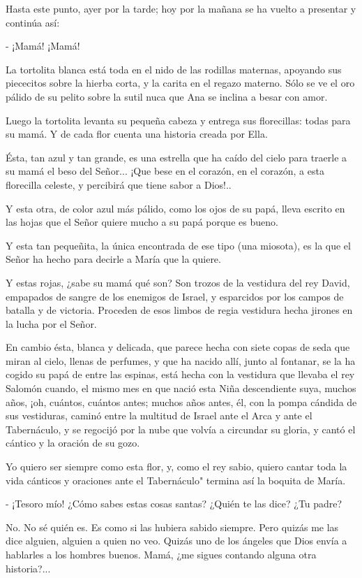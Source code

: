 \documentclass[12pt]{book} %
\begin{document}
Hasta este punto, ayer por la tarde; hoy por la mañana se ha vuelto a presentar y continúa así: 

- ¡Mamá! ¡Mamá! 

La tortolita blanca está toda en el nido de las rodillas maternas, apoyando sus piececitos sobre la hierba corta, y la carita en el regazo materno. Sólo se ve el oro pálido de su pelito sobre la sutil nuca que Ana se inclina a besar con amor. 

Luego la tortolita levanta su pequeña cabeza y entrega sus florecillas: todas para su mamá. Y de cada flor cuenta una historia creada por Ella. 

Ésta, tan azul y tan grande, es una estrella que ha caído del cielo para traerle a su mamá el beso del Señor... ¡Que bese en el corazón, en el corazón, a esta florecilla celeste, y percibirá que tiene sabor a Dios!.. 

Y esta otra, de color azul más pálido, como los ojos de su papá, lleva escrito en las hojas que el Señor quiere mucho a su papá porque es bueno. 

Y esta tan pequeñita, la única encontrada de ese tipo (una miosota), es la que el Señor ha hecho para decirle a María que la quiere. 

Y estas rojas, ¿sabe su mamá qué son? Son trozos de la vestidura del rey David, empapados de sangre de los enemigos de Israel, y esparcidos por los campos de batalla y de victoria. Proceden de esos limbos de regia vestidura hecha jirones en la lucha por el Señor. 

En cambio ésta, blanca y delicada, que parece hecha con siete copas de seda que miran al cielo, llenas de perfumes, y que ha nacido allí, junto al fontanar, se la ha cogido su papá de entre las espinas, está hecha con la vestidura que llevaba el rey Salomón cuando, el mismo mes en que nació esta Niña descendiente suya, muchos años, ¡oh, cuántos, cuántos antes; muchos años antes, él, con la pompa cándida de sus vestiduras, caminó entre la multitud de Israel ante el Arca y ante el Tabernáculo, y se regocijó por la nube que volvía a circundar su gloria, y cantó el cántico y la oración de su gozo. 

Yo quiero ser siempre como esta flor, y, como el rey sabio, quiero cantar toda la vida cánticos y oraciones ante el Tabernáculo" termina así la boquita de María. 

- ¡Tesoro mío! ¿Cómo sabes estas cosas santas? ¿Quién te las dice? ¿Tu padre? 

No. No sé quién es. Es como si las hubiera sabido siempre. Pero quizás me las dice alguien, alguien a quien no veo. Quizás uno de los ángeles que Dios envía a hablarles a los hombres buenos. Mamá, ¿me sigues contando alguna otra historia?... 
\end{document}

